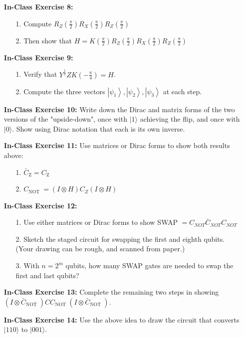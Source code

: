 \documentclass[main.tex]{subfiles}
\begin{document}
\begin{enumerate}
\item[] \textbf{In-Class Exercise 8:} 
\begin{enumerate}
    \item [1.]  Compute $R_{Z}\left(\frac{\pi}{2}\right) R_{X}\left(\frac{\pi}{2}\right) R_{Z}\left(\frac{\pi}{2}\right)$
    \item [2.] Then show that $H=K\left(\frac{\pi}{2}\right) R_{Z}\left(\frac{\pi}{2}\right) R_{X}\left(\frac{\pi}{2}\right) R_{Z}\left(\frac{\pi}{2}\right)$
\end{enumerate}

\item[] \textbf{In-Class Exercise 9:} 
\begin{enumerate}
    \item [1.] Verify that $Y^{\frac{1}{2}} Z K\left(-\frac{\pi}{4}\right)=H$.
    \item [2.] Compute the three vectors $\left|\psi_{1}\right\rangle,\left|\psi_{2}\right\rangle,\left|\psi_{3}\right\rangle$ at each step.
\end{enumerate}

\item[] \textbf{In-Class Exercise 10:} Write down the Dirac and matrix forms of the two versions of the "upside-down", once with $|1\rangle$ achieving the flip, and once with $|0\rangle$. Show using Dirac notation that each is its own inverse. 

\item[] \textbf{In-Class Exercise 11:} Use matrices or Dirac forms to show both results above:
\begin{enumerate}
    \item [1.] $\bar{C}_{\mathrm{Z}}=C_{\mathrm{Z}}$
    \item [2.] $C_{\text {NOT }}=(I \otimes H) C_{Z}(I \otimes H)$
\end{enumerate}

\item[] \textbf{In-Class Exercise 12:}
\begin{enumerate}
    \item [1.] Use either matrices or Dirac forms to show SWAP $=C_{N O T} \bar{C}_{NOT} C_{NOT}$
    \item [2.] Sketch the staged circuit for swapping the first and eighth qubits. (Your drawing can be rough, and scanned from paper.)
    \item [3.] With $n=2^{m}$ qubits, how many SWAP gates are needed to swap the first and last qubits?
\end{enumerate}
 
\item[] \textbf{In-Class Exercise 13:} Complete the remaining two steps in showing $\left(I \otimes \bar{C}_{\text {NOT }}\right) C C_{\text {NOT }}\left(I \otimes \bar{C}_{\text {NOT }}\right)$.

\item[] \textbf{In-Class Exercise 14:} Use the above idea to draw the circuit that converts $|110\rangle$ to $|001\rangle$.

\end{enumerate}
\end{document}
